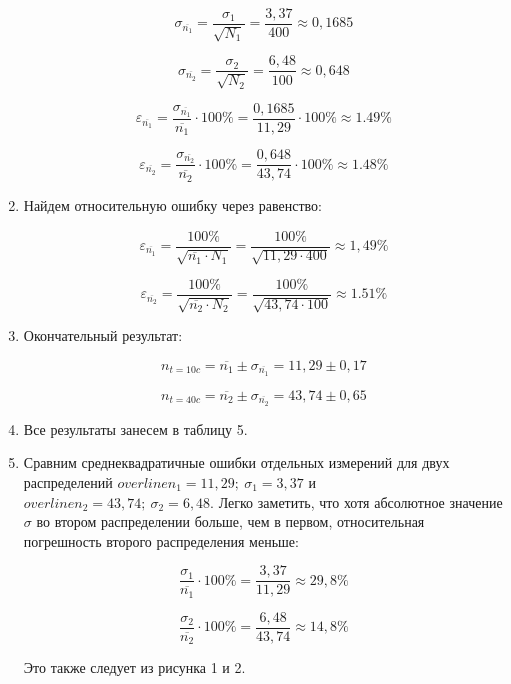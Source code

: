 \documentclass[a4paper, 12pt]{article} %
\begin{document}
\begin{enumerate}
\[ \sigma_{\overline{n_1}} = \frac{\sigma_1}{\sqrt{N_1}} = \frac{3,37}{400} \approx 0,1685\]

\[ \sigma_{\overline{n_2}} = \frac{\sigma_2}{\sqrt{N_2}} = \frac{6,48}{100} \approx 0,648\]

\[ \varepsilon_{\overline{n_1}} = \frac{\sigma_{\overline{n_1}}}{\overline{n_1}} \cdot 100\% = \frac{0,1685}{11,29} \cdot 100 \% \approx1.49\% \]

\[ \varepsilon_{\overline{n_2}} = \frac{\sigma_{\overline{n_2}}}{\overline{n_2}} \cdot 100\% = \frac{0,648}{43,74} \cdot 100 \% \approx1.48\% \]

\item
Найдем относительную ошибку через равенство:

\[ \varepsilon_{\overline{n_1}} = \frac{100\%}{\sqrt{\overline{n_1} \cdot N_1}} = \frac{100\%}{\sqrt{11,29 \cdot 400}} \approx 1,49\% \]

\[ \varepsilon_{\overline{n_2}} = \frac{100\%}{\sqrt{\overline{n_2} \cdot N_2}} = \frac{100\%}{\sqrt{43,74 \cdot 100}} \approx 1.51\% \]

\item
Окончательный результат:

\[ n_{t=10c} = \overline{n_1} \pm \sigma_{\overline{n_1}} = 11,29 \pm 0,17\]

\[ n_{t=40c} = \overline{n_2} \pm \sigma_{\overline{n_2}} = 43,74 \pm 0,65\]

\item
Все результаты занесем в таблицу 5.


\item
Сравним среднеквадратичные ошибки отдельных измерений для двух распределений \(overline{n_1} = 11,29; \ \sigma_1 = 3,37\) и \(overline{n_2} = 43,74; \ \sigma_2 = 6,48\). Легко заметить, что хотя абсолютное значение \(\sigma\) во втором распределении больше, чем в первом, относительная погрешность второго распределения меньше:

\[ \frac{\sigma_1}{\overline{n_1}} \cdot 100\% = \frac{3,37}{11,29} \approx 29,8 \% \]

\[ \frac{\sigma_2}{\overline{n_2}} \cdot 100\% = \frac{6,48}{43,74} \approx 14,8 \% \]

Это также следует из рисунка 1 и 2.

\end{enumerate}
\end{document}
